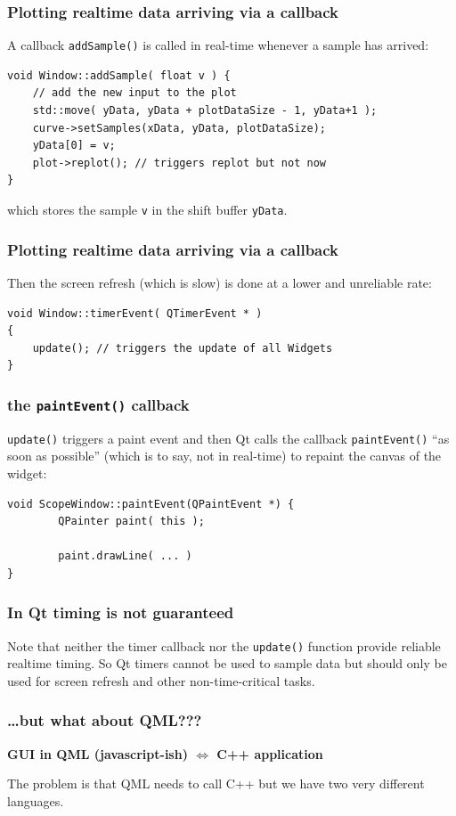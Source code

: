 \documentclass[xcolor=dvipsnames]{beamer}
\begin{document}
\begin{frame}[fragile]
\frametitle{Plotting realtime data arriving via a callback}
A callback \texttt{addSample()} is called in real-time whenever
a sample has arrived:
\begin{verbatim}
void Window::addSample( float v ) {
    // add the new input to the plot
    std::move( yData, yData + plotDataSize - 1, yData+1 );
    curve->setSamples(xData, yData, plotDataSize);
    yData[0] = v;
    plot->replot(); // triggers replot but not now
}
\end{verbatim}
which stores the sample \texttt{v} in the shift buffer \texttt{yData}.
\end{frame}


\begin{frame}[fragile]
\frametitle{Plotting realtime data arriving via a callback}
Then the screen refresh (which is slow) is done at
a lower and unreliable rate:
\begin{verbatim}
void Window::timerEvent( QTimerEvent * )
{
    update(); // triggers the update of all Widgets
}
\end{verbatim}
\end{frame}


\begin{frame}[fragile]
\frametitle{the \texttt{paintEvent()} callback}
\texttt{update()} triggers a
paint event and then Qt calls the callback \texttt{paintEvent()}
``as soon as possible'' (which is to say, not in real-time) to repaint
the canvas of the widget:
\begin{verbatim}
void ScopeWindow::paintEvent(QPaintEvent *) {
        QPainter paint( this );

        paint.drawLine( ... )
}
\end{verbatim}
\end{frame}


\begin{frame}[fragile]
\frametitle{In Qt timing is not guaranteed}
Note that neither the timer callback nor the \texttt{update()} function
provide reliable realtime timing.
So Qt timers cannot be used to sample data but should
only be used for screen refresh and other non-time-critical
tasks.
\end{frame}



\begin{frame}[fragile]
\frametitle{\ldots but what about QML???}


\textbf{GUI in QML (javascript-ish) $\Leftrightarrow$ C++ application}

\bigskip

The problem is that QML needs to call C++ but we have two
very different languages.

\end{frame}
\end{document}
